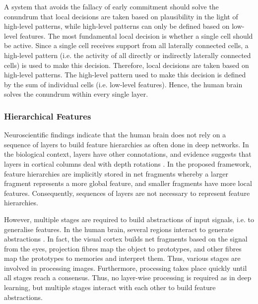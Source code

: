 A system that avoids the fallacy of early commitment should solve the conundrum that local decisions are taken based on plausibility in the light of high-level patterns, while high-level patterns can only be defined based on low-level features.
The most fundamental local decision is whether a single cell should be active. Since a single cell receives support from all laterally connected cells, a high-level pattern (i.e. the activity of all directly or indirectly laterally connected cells) is used to make this decision. Therefore, local decisions are taken based on high-level patterns. The high-level pattern used to make this decision is defined by the sum of individual cells (i.e. low-level features). Hence, the human brain solves the conundrum within every single layer.


\subsubsection{Hierarchical Features}
Neuroscientific findings indicate that the human brain does not rely on a sequence of layers to build feature hierarchies as often done in deep networks.
In the biological context, layers have other connotations, and evidence suggests that layers in cortical columns deal with depth rotations .
In the proposed framework, feature hierarchies are implicitly stored in net fragments whereby a larger fragment represents a more global feature, and smaller fragments have more local features.
Consequently, sequences of layers are not necessary to represent feature hierarchies.

However, multiple stages are required to build abstractions of input signals, i.e. to generalise features.
In the human brain, several regions interact to generate abstractions .
In fact, the visual cortex builds net fragments based on the signal from the eyes, projection fibres map the object to prototypes, and other fibres map the prototypes to memories and interpret them. Thus, various stages are involved in processing images.
Furthermore, processing takes place quickly until all stages reach a consensus. Thus, no layer-wise processing is required as in deep learning, but multiple stages interact with each other to build feature abstractions.

